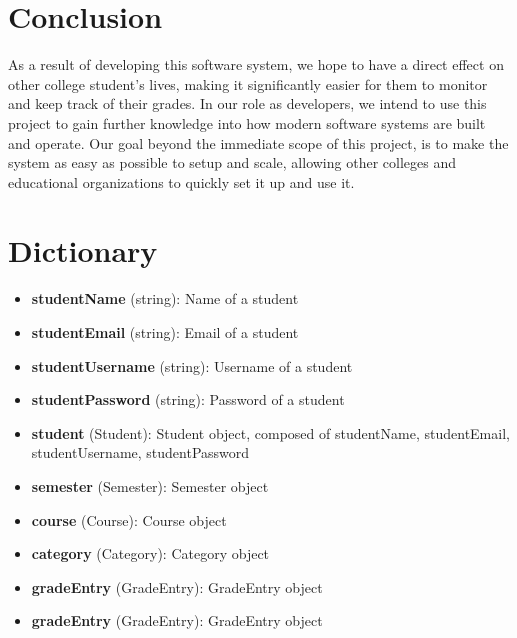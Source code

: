 \documentclass[12pt]{article}
\newcommand{\dictitem}[1]{\item \textbf{#1}:}
\newenvironment{dict}
{
    \begin{itemize}
}
{
    \end{itemize}
}
\begin{document}
\clearpage


\section{Conclusion}
As a result of developing this software system, we hope to have a direct effect on other college
student's lives, making it significantly easier for them to monitor and keep track of their grades.
In our role as developers, we intend to use this project to gain further knowledge into how modern
software systems are built and operate. Our goal beyond the immediate scope of this project, is to
make the system as easy as possible to setup and scale, allowing other colleges and educational
organizations to quickly set it up and use it.

\section{Dictionary}
\begin{dict}
    \item \textbf{studentName} (string): Name of a student
    \item \textbf{studentEmail} (string): Email of a student
    \item \textbf{studentUsername} (string): Username of a student
    \item \textbf{studentPassword} (string): Password of a student
    \item \textbf{student} (Student): Student object, composed of studentName, studentEmail,
          studentUsername, studentPassword
    \item \textbf{semester} (Semester): Semester object
    \item \textbf{course} (Course): Course object
    \item \textbf{category} (Category): Category object
    \item \textbf{gradeEntry} (GradeEntry): GradeEntry object
    \item \textbf{gradeEntry} (GradeEntry): GradeEntry object
\end{itemize}
\end{document}
